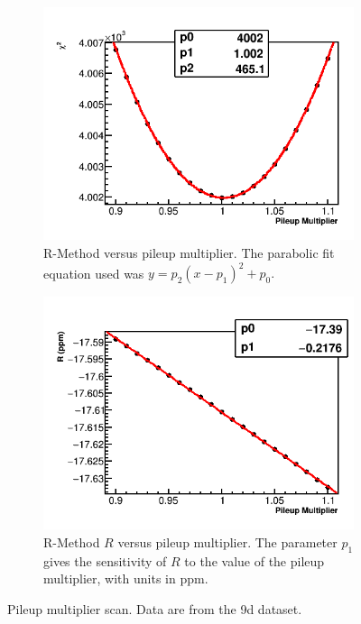\begin{figure}[h]
    \begin{subfigure}[t]{0.45\textwidth}
        \centering
        \includegraphics[width=\textwidth]{FullRatio_Chi2_Vs_PileupMultiplier_Canv}
        \caption{R-Method \chisq versus pileup multiplier. The parabolic fit equation used was $y = p_{2}(x - p_{1})^{2} + p_{0}.$}
    \end{subfigure}%
    \hspace{1cm}
    \begin{subfigure}[t]{0.45\textwidth}
        \centering
        \includegraphics[width=\textwidth]{FullRatio_R_Vs_PileupMultiplier_Canv}
        \caption{R-Method $R$ versus pileup multiplier. The parameter $p_{1}$ gives the sensitivity of $R$ to the value of the pileup multiplier, with units in ppm.}
    \end{subfigure}
\caption[Pileup multiplier scan]{Pileup multiplier scan. Data are from the 9d dataset.}
\label{fig:PMscan}
\end{figure}



